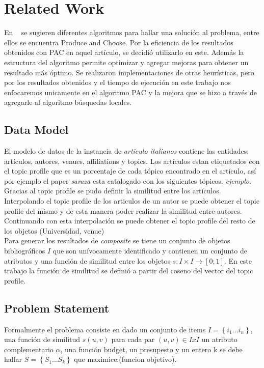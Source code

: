 \section{Related Work}
En ~\cite{compositeRetrival} se sugieren diferentes algoritmos para hallar una solución al problema, entre ellos se encuentra Produce and Choose. Por la eficiencia de los resultados obtenidos con PAC en aquel artículo, se decidió utilizarlo en este. Además la estructura del algoritmo permite optimizar y agregar mejoras para obtener un resultado más óptimo. Se realizaron implementaciones de otras heurísticas, pero por los resultados obtenidos y el tiempo de ejecución en este trabajo nos enfocaremos unicamente en el algoritmo PAC y la mejora que se hizo a través de agregarle al algoritmo búsquedas locales.

\subsection{Data Model}\label{body-data-model}
El modelo de datos de la instancia de \textit{articulo italianos} contiene las entidades: artículos, autores, venues, affiliations y topics. Los artículos estan etiquetados con el topic profile que es un porcentaje de cada tópico encontrado en el artículo, así por ejemplo el paper \textit{saraza} esta catalogado con los siguientes tópicos: \textit{ejemplo}.\\
Gracias al topic profile se pudo definir la similitud entre los artículos. Interpolando el topic profile de los articulos de un autor se puede obtener el topic profile del mismo y de esta manera poder realizar la similitud entre autores. Continuando con esta interpolación se puede obtener el topic profile del resto de los objetos (Universidad, venue)\\
Para generar los resultados de \textit{composite} se tiene un conjunto de objetos bibliográficos $I$ que son unívocamente identificado y contienen un conjunto de atributos y una función de similitud entre los objetos $ s: I \times I \rightarrow [0;1]$. En este trabajo la función de similitud se definió a partir del coseno del vector del topic profile.\\
\subsection{Problem Statement}
Formalmente el problema consiste en dado un conjunto de items $ I=\left\{i_1 \ldots i_n\right\} $, una función de similitud $ s(u,v) $ para cada par $ (u,v) \in IxI $ un atributo complementario $\alpha$, una función budget, un presupesto y un entero k se debe hallar $ S=\left\{S_1 \ldots S_k\right\} $ que maximice:(funcion objetivo).

